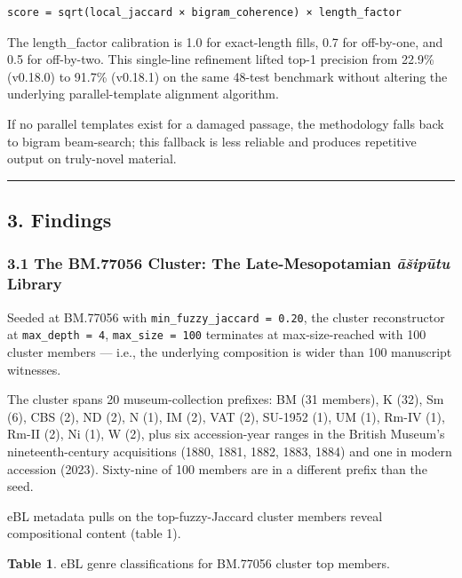 \documentclass[
  11pt,
  letterpaper,
]{article}
\begin{document}
\begin{verbatim}
score = sqrt(local_jaccard × bigram_coherence) × length_factor
\end{verbatim}

The length\_factor calibration is 1.0 for exact-length fills, 0.7 for
off-by-one, and 0.5 for off-by-two. This single-line refinement lifted
top-1 precision from 22.9\% (v0.18.0) to 91.7\% (v0.18.1) on the same
48-test benchmark without altering the underlying parallel-template
alignment algorithm.

If no parallel templates exist for a damaged passage, the methodology
falls back to bigram beam-search; this fallback is less reliable and
produces repetitive output on truly-novel material.

\begin{center}\rule{0.5\linewidth}{0.5pt}\end{center}

\subsection{3. Findings}\label{findings}

\subsubsection{\texorpdfstring{3.1 The BM.77056 Cluster: The
Late-Mesopotamian \emph{āšipūtu}
Library}{3.1 The BM.77056 Cluster: The Late-Mesopotamian āšipūtu Library}}\label{the-bm.77056-cluster-the-late-mesopotamian-ux101ux161ipux16btu-library}

Seeded at BM.77056 with \texttt{min\_fuzzy\_jaccard\ =\ 0.20}, the
cluster reconstructor at \texttt{max\_depth\ =\ 4},
\texttt{max\_size\ =\ 100} terminates at max-size-reached with 100
cluster members --- i.e., the underlying composition is wider than 100
manuscript witnesses.

The cluster spans 20 museum-collection prefixes: BM (31 members), K
(32), Sm (6), CBS (2), ND (2), N (1), IM (2), VAT (2), SU-1952 (1), UM
(1), Rm-IV (1), Rm-II (2), Ni (1), W (2), plus six accession-year ranges
in the British Museum's nineteenth-century acquisitions (1880, 1881,
1882, 1883, 1884) and one in modern accession (2023). Sixty-nine of 100
members are in a different prefix than the seed.

eBL metadata pulls on the top-fuzzy-Jaccard cluster members reveal
compositional content (table 1).

\textbf{Table 1}. eBL genre classifications for BM.77056 cluster top
members.
\end{document}
